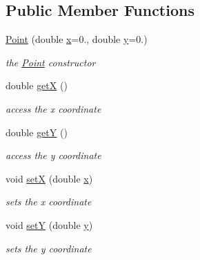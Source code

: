 \subsection*{Public Member Functions}
\begin{DoxyCompactItemize}
\item 
\mbox{\hyperlink{class_jinks_draw_1_1_point_a052cf69d98628f9ee7fd6649c401c409}{Point}} (double \mbox{\hyperlink{class_jinks_draw_1_1_point_a49a46c3d78c0c68260d55dacdee458de}{x}}=0., double \mbox{\hyperlink{class_jinks_draw_1_1_point_ad2dbfbd07baf41cfe82737a4f347bab5}{y}}=0.)
\begin{DoxyCompactList}\small\item\em the \mbox{\hyperlink{class_jinks_draw_1_1_point}{Point}} constructor \end{DoxyCompactList}\item 
double \mbox{\hyperlink{class_jinks_draw_1_1_point_ab7f568b7614e93baeb6a2b80ae6d4eda}{getX}} ()
\begin{DoxyCompactList}\small\item\em access the x coordinate \end{DoxyCompactList}\item 
double \mbox{\hyperlink{class_jinks_draw_1_1_point_a3dcffb5d490aa4c17a6d468b944fc590}{getY}} ()
\begin{DoxyCompactList}\small\item\em access the y coordinate \end{DoxyCompactList}\item 
void \mbox{\hyperlink{class_jinks_draw_1_1_point_a88c728619ffd56b0a05e73aa12a749e1}{setX}} (double \mbox{\hyperlink{class_jinks_draw_1_1_point_a49a46c3d78c0c68260d55dacdee458de}{x}})
\begin{DoxyCompactList}\small\item\em sets the x coordinate \end{DoxyCompactList}\item 
void \mbox{\hyperlink{class_jinks_draw_1_1_point_a828cbcb4a21065420758e422265dc35f}{setY}} (double \mbox{\hyperlink{class_jinks_draw_1_1_point_ad2dbfbd07baf41cfe82737a4f347bab5}{y}})
\begin{DoxyCompactList}\small\item\em sets the y coordinate \end{DoxyCompactList}\end{DoxyCompactItemize}
